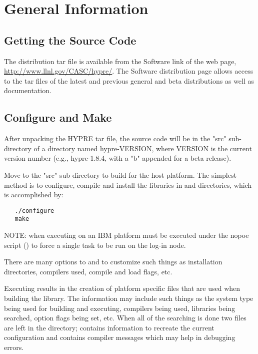 
\chapter{General Information}


\section{Getting the Source Code}

The \hypre{} distribution tar file is available from the Software link of the
\hypre{} web page, \url{http://www.llnl.gov/CASC/hypre/}.  The \hypre{}
Software distribution page allows access to the tar files of the latest and
previous general and beta distributions as well as documentation.


\section{Configure and Make}

After unpacking the HYPRE tar file, the source code will be in the "src" 
sub-directory of a directory named hypre-VERSION, where VERSION is the current 
version number (e.g., hypre-1.8.4, with a "b" appended for a beta release).

Move to the "src" sub-directory to build \hypre{} for the host platform.  The 
simplest method is to configure, compile and install the libraries in 
and  directories, which is accomplished by:
\begin{verbatim}
   ./configure
   make
\end{verbatim}

NOTE: when executing on an IBM platform  must be executed under 
the nopoe script () to force a single 
task to be run on the log-in node.

There are many options to  and  to customize such 
things as installation directories, compilers used, compile and load flags, etc.

Executing  results in the creation of platform specific files 
that are used when building the library. The information may include such things
as the system type being used for building and executing, compilers being used, 
libraries being searched, option flags being set, etc.  When all of the searching
is done two files are left in the  directory;  
contains information to recreate the current configuration and 
contains compiler messages which may help in debugging  errors. 


